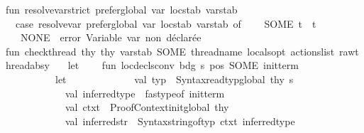 \begin{isabellebody}
fun\ resolve{\isacharunderscore}{\kern0pt}var{\isacharunderscore}{\kern0pt}strict\ prefer{\isacharunderscore}{\kern0pt}global\ var\ locstab\ varstab\ {\isacharequal}{\kern0pt}\isanewline
\ \ case\ resolve{\isacharunderscore}{\kern0pt}var\ prefer{\isacharunderscore}{\kern0pt}global\ var\ locstab\ varstab\ of\isanewline
\ \ \ \ SOME\ t\ {\isacharequal}{\kern0pt}{\isachargreater}{\kern0pt}\ t\isanewline
\ \ {\isacharbar}{\kern0pt}\ NONE\ {\isacharequal}{\kern0pt}{\isachargreater}{\kern0pt}\ error\ {\isacharparenleft}{\kern0pt}{\isachardoublequote}{\kern0pt}Variable\ {\isachardoublequote}{\kern0pt}{\isacharcircum}{\kern0pt}var{\isacharcircum}{\kern0pt}{\isachardoublequote}{\kern0pt}\ non\ déclarée{\isachardoublequote}{\kern0pt}{\isacharparenright}{\kern0pt}\isanewline
\isanewline
fun\ check{\isacharunderscore}{\kern0pt}thread\ thy\ thy{}\ vars{\isacharunderscore}{\kern0pt}tab\ {\isacharparenleft}{\kern0pt}{\isacharparenleft}{\kern0pt}{\isacharparenleft}{\kern0pt}SOME\ thread{\isacharunderscore}{\kern0pt}name{\isacharcomma}{\kern0pt}\ locals{\isacharunderscore}{\kern0pt}opt{\isacharparenright}{\kern0pt}{\isacharcomma}{\kern0pt}\ actions{\isacharunderscore}{\kern0pt}list{\isacharparenright}{\kern0pt}{\isacharcolon}{\kern0pt}\ raw{\isacharunderscore}{\kern0pt}thread{\isacharunderscore}{\kern0pt}absy{\isacharparenright}{\kern0pt}\ {\isacharequal}{\kern0pt}\isanewline
\ \ let\isanewline
\ \ \ \ fun\ loc{\isacharunderscore}{\kern0pt}decls{\isacharunderscore}{\kern0pt}conv\ {\isacharparenleft}{\kern0pt}{\isacharparenleft}{\kern0pt}bdg{\isacharcomma}{\kern0pt}\ {\isacharparenleft}{\kern0pt}s{\isacharcomma}{\kern0pt}\ pos{\isacharparenright}{\kern0pt}{\isacharparenright}{\kern0pt}{\isacharcomma}{\kern0pt}\ SOME\ init{\isacharunderscore}{\kern0pt}term{\isacharparenright}{\kern0pt}\ {\isacharequal}{\kern0pt}\isanewline
\ \ \ \ \ \ \ \ \ \ let\ \isanewline
\ \ \ \ \ \ \ \ \ \ \ \ val\ typ\ {\isacharequal}{\kern0pt}\ Syntax{\isachardot}{\kern0pt}read{\isacharunderscore}{\kern0pt}typ{\isacharunderscore}{\kern0pt}global\ thy\ s\isanewline
\ \ \ \ \ \ \ \ \ \ \ \ val\ inferred{\isacharunderscore}{\kern0pt}type\ {\isacharequal}{\kern0pt}\ fastype{\isacharunderscore}{\kern0pt}of\ init{\isacharunderscore}{\kern0pt}term\isanewline
\ \ \ \ \ \ \ \ \ \ \ \ val\ ctxt\ {\isacharequal}{\kern0pt}\ Proof{\isacharunderscore}{\kern0pt}Context{\isachardot}{\kern0pt}init{\isacharunderscore}{\kern0pt}global\ thy\isanewline
\ \ \ \ \ \ \ \ \ \ \ \ val\ inferred{\isacharunderscore}{\kern0pt}str\ {\isacharequal}{\kern0pt}\ Syntax{\isachardot}{\kern0pt}string{\isacharunderscore}{\kern0pt}of{\isacharunderscore}{\kern0pt}typ\ ctxt\ inferred{\isacharunderscore}{\kern0pt}type\isanewline

\end{isabellebody}
